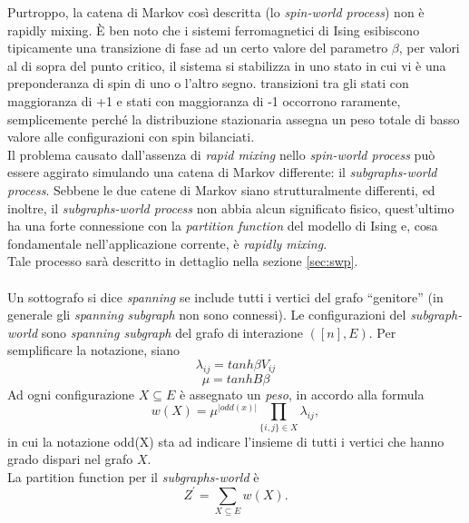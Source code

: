 Purtroppo, la catena di Markov così descritta (lo \textit{spin-world process}) non è rapidly mixing. È ben noto che i sistemi ferromagnetici di Ising esibiscono tipicamente una transizione di fase ad un certo valore del parametro $\beta$, per valori al di sopra del punto critico, il sistema si stabilizza in uno stato in cui vi è una preponderanza di spin di uno o l'altro segno. transizioni tra gli stati con maggioranza di +1 e stati con maggioranza di -1 occorrono raramente, semplicemente perché la distribuzione stazionaria assegna un peso totale di basso valore alle configurazioni con spin bilanciati.\\
Il problema causato dall'assenza di \textit{rapid mixing} nello \textit{spin-world process} può essere aggirato simulando una catena di Markov differente: il \textit{subgraphs-world process}. Sebbene le due catene di Markov siano strutturalmente differenti, ed inoltre, il \textit{subgraphs-world process} non abbia alcun significato fisico, quest'ultimo ha una forte connessione con la \textit{partition function} del modello di Ising e, cosa fondamentale nell'applicazione corrente, è \textit{rapidly mixing}.\\
Tale processo sarà descritto in dettaglio nella sezione \ref{sec:swp}.\\\\
Un sottografo si dice \textit{spanning} se include tutti i vertici del grafo ``genitore'' (in generale gli \textit{spanning subgraph} non sono connessi). Le configurazioni del \textit{subgraph-world} sono \textit{spanning subgraph} del grafo di interazione $([n], E)$. Per semplificare la notazione, siano
\begin{equation}
	\lambda_{ij} = tanh \beta V_{ij}
	\label{lamij}
\end{equation}
\begin{equation}
	\mu = tanh B \beta
	\label{mu}
\end{equation}
Ad ogni configurazione $X \subseteq E$ è assegnato un \textit{peso}, in accordo alla formula
\begin{equation}
	w(X) = \mu^{|odd(x)|}\prod_{\{i,j\} \in X}{\lambda_{ij}},
	\label{weightfunc}
\end{equation}
in cui la notazione odd(X) sta ad indicare l'insieme di tutti i vertici che hanno grado dispari nel grafo $X$.\\
La partition function per il \textit{subgraphs-world} è
\begin{equation}
	Z^\prime = \sum_{X \subseteq E}{w(X)}.
	\label{zprime}
\end{equation}
